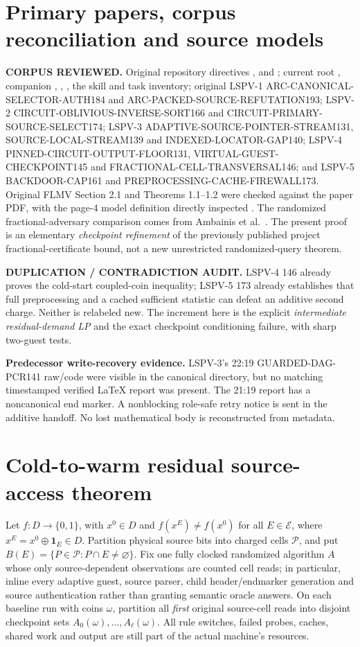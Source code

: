 \documentclass[11pt]{article}
\begin{document}
\section{Primary papers, corpus reconciliation and source models}
\textbf{CORPUS REVIEWED.} Original repository directives
,
 and
; current
root , companion , ,
, the  skill and task inventory;
original LSPV-1 ARC-CANONICAL-SELECTOR-AUTH184 and
ARC-PACKED-SOURCE-REFUTATION193; LSPV-2
CIRCUIT-OBLIVIOUS-INVERSE-SORT166 and CIRCUIT-PRIMARY-SOURCE-SELECT174;
LSPV-3 ADAPTIVE-SOURCE-POINTER-STREAM131, SOURCE-LOCAL-STREAM139
and INDEXED-LOCATOR-GAP140; LSPV-4
PINNED-CIRCUIT-OUTPUT-FLOOR131, VIRTUAL-GUEST-CHECKPOINT145 and
FRACTIONAL-CELL-TRANSVERSAL146; and LSPV-5 BACKDOOR-CAP161
and PREPROCESSING-CACHE-FIREWALL173.
Original FLMV Section 2.1 and Theorems 1.1--1.2 were checked
against the paper PDF, with the page-4 model definition directly inspected
\cite{flmv}. The randomized fractional-adversary comparison comes from
Ambainis et al.\ \cite{ambainis}. The present proof is an elementary
\emph{checkpoint refinement} of the previously published project
fractional-certificate bound, not a new unrestricted randomized-query theorem.

\textbf{DUPLICATION / CONTRADICTION AUDIT.} LSPV-4 146 already proves
the cold-start coupled-coin inequality; LSPV-5 173 already establishes
that full preprocessing and a cached sufficient statistic can defeat an
additive second charge. Neither is relabeled new. The increment here is
the explicit \emph{intermediate residual-demand LP} and the exact
checkpoint conditioning failure, with sharp two-guest tests.

\textbf{Predecessor write-recovery evidence.} LSPV-3's 22:19
GUARDED-DAG-PCR141 raw/code were visible in the canonical directory,
but no matching timestamped verified LaTeX report was present.
The 21:19 report has a noncanonical end marker.
A nonblocking role-safe retry notice is sent in the additive handoff.
No lost mathematical body is reconstructed from metadata.

\section{Cold-to-warm residual source-access theorem}
Let $f:D\to\{0,1\}$, with $x^0\in D$ and
$f(x^E)\ne f(x^0)$ for all $E\in\mathcal E$, where
$x^E=x^0\oplus\mathbf1_E\in D$. Partition physical source bits into
charged cells $\mathcal P$, and put
$B(E)=\{P\in\mathcal P:P\cap E\ne\varnothing\}$.
Fix one fully clocked randomized algorithm $A$ whose only source-dependent
observations are counted cell reads; in particular, inline every adaptive
guest, source parser, child header/endmarker generation and source
authentication rather than granting semantic oracle answers.
On each baseline run with coins $\omega$, partition all \emph{first}
original source-cell reads into disjoint checkpoint sets
$A_0(\omega),\ldots,A_\ell(\omega)$.
All rule switches, failed probes, caches, shared work and output are still
part of the actual machine's resources.
\end{document}

